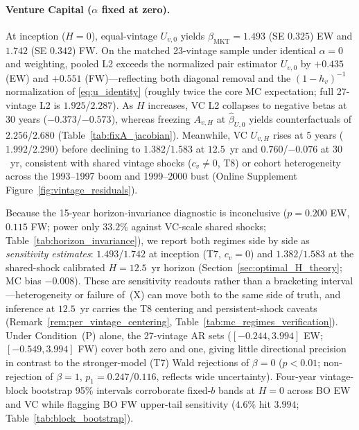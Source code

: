 \documentclass[12pt]{article}
\begin{document}
\paragraph{Venture Capital ($\alpha$ fixed at zero).}
At inception ($H = 0$), equal-vintage $U_{v,0}$ yields $\hat\beta_{\mathrm{MKT}} = 1.493$ (SE $0.325$) EW and $1.742$ (SE $0.342$) FW.
On the matched 23-vintage sample under identical $\alpha = 0$ and weighting, pooled L2 exceeds the normalized pair estimator $U_{v,0}$ by $+0.435$ (EW) and $+0.551$ (FW)---reflecting both diagonal removal and the $(1-h_v)^{-1}$ normalization of \eqref{eq:u_identity} (roughly twice the core MC expectation; full 27-vintage L2 is $1.925$/$2.287$).
As $H$ increases, VC L2 collapses to negative betas at 30 years ($-0.373$/$-0.573$), whereas freezing $A_{v,H}$ at $\hat\beta_{U,0}$ yields counterfactuals of $2.256$/$2.680$ (Table~\ref{tab:fixA_jacobian}).
Meanwhile, VC $U_{v,H}$ rises at 5 years ($1.992$/$2.290$) before declining to $1.382$/$1.583$ at $12.5$~yr and $0.760$/$-0.076$ at $30$~yr, consistent with shared vintage shocks ($c_v \neq 0$, T8) or cohort heterogeneity across the 1993--1997 boom and 1999--2000 bust (Online Supplement Figure~\ref{fig:vintage_residuals}).

Because the 15-year horizon-invariance diagnostic is inconclusive ($p = 0.200$ EW, $0.115$ FW; power only $33.2\%$ against VC-scale shared shocks; Table~\ref{tab:horizon_invariance}), we report both regimes side by side as \emph{sensitivity estimates}: $1.493$/$1.742$ at inception (T7, $c_v = 0$) and $1.382$/$1.583$ at the shared-shock calibrated $H = 12.5$~yr horizon (Section~\ref{sec:optimal_H_theory}; MC bias $-0.008$).
These are sensitivity readouts rather than a bracketing interval---heterogeneity or failure of~(X) can move both to the same side of truth, and inference at $12.5$~yr carries the T8 centering and persistent-shock caveats (Remark~\ref{rem:per_vintage_centering}, Table~\ref{tab:mc_regimes_verification}).
Under Condition~(P) alone, the 27-vintage AR sets ($[-0.244, 3.994]$ EW; $[-0.549, 3.994]$ FW) cover both zero and one, giving little directional precision in contrast to the stronger-model (T7) Wald rejections of $\beta = 0$ ($p < 0.01$; non-rejection of $\beta = 1$, $p_1 = 0.247/0.116$, reflects wide uncertainty).
Four-year vintage-block bootstrap 95\% intervals corroborate fixed-$b$ bands at $H=0$ across BO EW and VC while flagging BO FW upper-tail sensitivity ($4.6\%$ hit $3.994$; Table~\ref{tab:block_bootstrap}).
\end{document}

